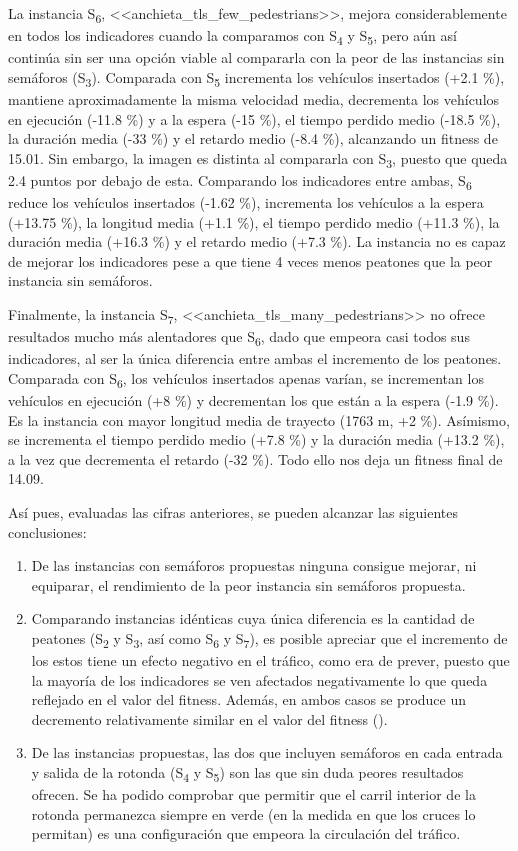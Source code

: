 La instancia S\textsubscript{6}, <<anchieta\_tls\_few\_pedestrians>>, mejora considerablemente en todos los indicadores cuando la comparamos con S\textsubscript{4} y S\textsubscript{5}, pero aún así continúa sin ser una opción viable al compararla con la peor de las instancias sin semáforos (S\textsubscript{3}). Comparada con S\textsubscript{5} incrementa los vehículos insertados (+2.1 \%), mantiene aproximadamente la misma velocidad media, decrementa los vehículos en ejecución (-11.8 \%) y a la espera (-15 \%), el tiempo perdido medio (-18.5 \%), la duración media (-33 \%) y el retardo medio (-8.4 \%), alcanzando un fitness de 15.01. Sin embargo, la imagen es distinta al compararla con S\textsubscript{3}, puesto que queda 2.4 puntos por debajo de esta. Comparando los indicadores entre ambas, S\textsubscript{6} reduce los vehículos insertados (-1.62 \%), incrementa los vehículos a la espera (+13.75 \%), la longitud media (+1.1 \%), el tiempo perdido medio (+11.3 \%), la duración media (+16.3 \%) y el retardo medio (+7.3 \%). La instancia no es capaz de mejorar los indicadores pese a que tiene 4 veces menos peatones que la peor instancia sin semáforos.

Finalmente, la instancia S\textsubscript{7}, <<anchieta\_tls\_many\_pedestrians>> no ofrece resultados mucho más alentadores que S\textsubscript{6}, dado que empeora casi todos sus indicadores, al ser la única diferencia entre ambas el incremento de los peatones. Comparada con S\textsubscript{6}, los vehículos insertados apenas varían, se incrementan los vehículos en ejecución (+8 \%) y decrementan los que están a la espera (-1.9 \%). Es la instancia con mayor longitud media de trayecto (1763 m, +2 \%). Asímismo, se incrementa el tiempo perdido medio (+7.8 \%) y la duración media (+13.2 \%), a la vez que decrementa el retardo (-32 \%). Todo ello nos deja un fitness final de 14.09.

Así pues, evaluadas las cifras anteriores, se pueden alcanzar las siguientes conclusiones:

\begin{enumerate}
    \item De las instancias con semáforos propuestas ninguna consigue mejorar, ni equiparar, el rendimiento de la peor instancia sin semáforos propuesta.
    \item  Comparando instancias idénticas cuya única diferencia es la cantidad de peatones (S\textsubscript{2} y S\textsubscript{3}, así como S\textsubscript{6} y S\textsubscript{7}), es posible apreciar que el incremento de los estos tiene un efecto negativo en el tráfico, como era de prever, puesto que la mayoría de los indicadores se ven afectados negativamente lo que queda reflejado en el valor del fitness. Además, en ambos casos se produce un decremento relativamente similar en el valor del fitness ().
    \item De las instancias propuestas, las dos que incluyen semáforos en cada entrada y salida de la rotonda (S\textsubscript{4} y S\textsubscript{5}) son las que sin duda peores resultados ofrecen. Se ha podido comprobar que permitir que el carril interior de la rotonda permanezca siempre en verde (en la medida en que los cruces lo permitan) es una configuración que empeora la circulación del tráfico.
\end{enumerate}